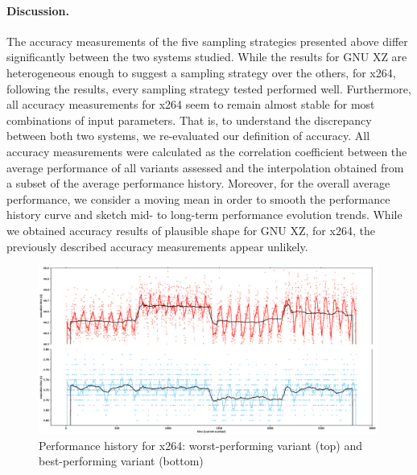 \paragraph{Discussion.} The accuracy measurements of the five sampling
strategies presented above differ significantly between the two systems
studied. While the results for GNU XZ are heterogeneous enough to suggest a
sampling strategy over the others, for x264, following the results, every
sampling strategy tested performed well. Furthermore, all accuracy measurements
for x264 seem to remain almost stable for most combinations of input
parameters. That is, to understand the discrepancy between both two systems, we
re-evaluated our definition of accuracy. All accuracy measurements were
calculated as the correlation coefficient between the average performance of
all variants assessed and the interpolation obtained from a subset of the
average performance history. Moreover, for the overall average performance, we
consider a moving mean in order to smooth the performance history curve and
sketch mid- to long-term performance evolution trends. While we obtained
accuracy results of plausible shape for GNU XZ, for x264, the previously described accuracy
measurements appear unlikely.

\begin{figure}[t!]
\centering
\includegraphics[width=0.99\textwidth]{images/x264_best_worst.eps}
\caption{Performance history for x264: worst-performing variant (top) and
best-performing variant (bottom)}
\label{fig:x264_worstbest}
\end{figure}

